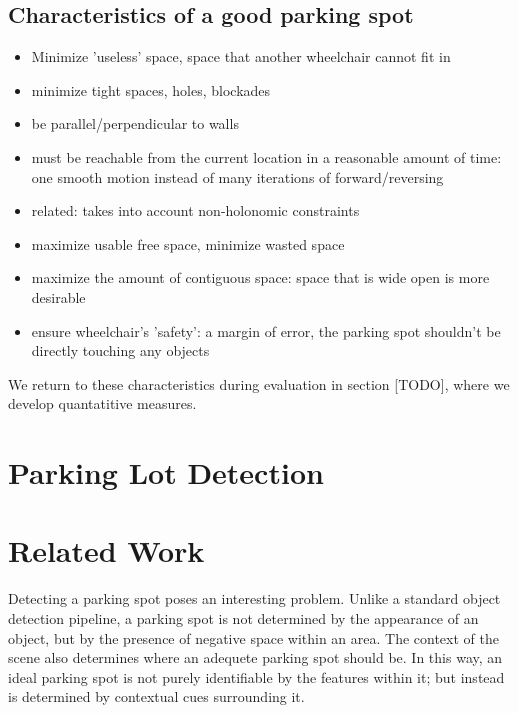 \subsection{Characteristics of a good parking spot}
\begin{itemize}
\item Minimize 'useless' space, space that another wheelchair cannot fit in 
\item minimize tight spaces, holes, blockades
\item be parallel/perpendicular to walls
\item must be reachable from the current location in a reasonable amount of
time: one smooth motion instead of many iterations of forward/reversing
\item related: takes into account non-holonomic constraints
\item maximize usable free space, minimize wasted space
\item maximize the amount of contiguous space: space that is wide open is more
desirable
\item ensure wheelchair's 'safety': a margin of error, the parking spot
shouldn't be directly touching any objects
\end{itemize}

We return to these characteristics during evaluation in section [TODO], where we
develop quantatitive measures.

\section{Parking Lot Detection}
% 
% 
% 
% 
% 
% 
% 
% 
% 
\section{Related Work}
\label{sec:parkinglotidentificationlitreview}
Detecting a parking spot poses an interesting problem. Unlike a standard object
detection pipeline, a parking spot is not determined by the appearance of an
object, but by the presence of negative space within an area. The context of the
scene also determines where an adequete parking spot should be. In this way, an
ideal parking spot is not purely identifiable by the features within it; but
instead is determined by contextual cues surrounding it.


